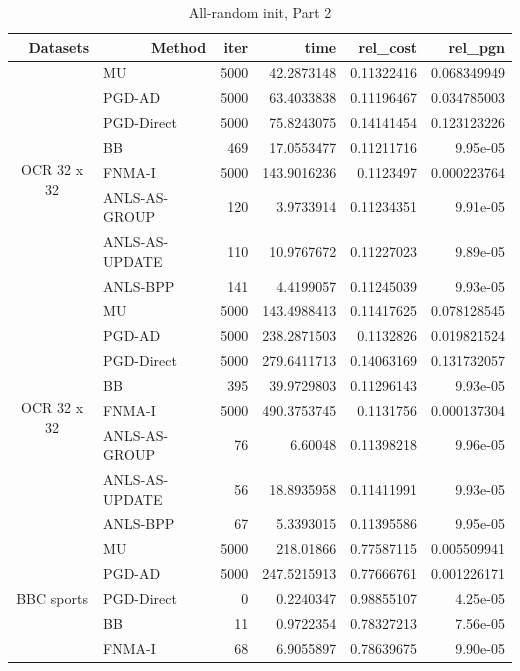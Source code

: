 \documentclass[conference,onecolumn,12pt]{IEEEtran}
\numberwithin{equation}{section}
\numberwithin{figure}{section}
\numberwithin{table}{section}
\theoremstyle{definition}
\begin{document}
\begin{table}[htbp]
	\centering
	\caption{All-random init, Part 2}
	  \begin{tabular}{clrrrr}
		\toprule
	  \multicolumn{1}{r}{Datasets} & \multicolumn{1}{r}{Method} & iter  & time  & rel\_cost & rel\_pgn \\ \midrule
	  \multirow{8}[0]{*}{OCR 32 x 32} & MU    & 5000  & 42.2873148 & 0.11322416 & 0.068349949 \\
			& PGD-AD & 5000  & 63.4033838 & 0.11196467 & 0.034785003 \\
			& PGD-Direct & 5000  & 75.8243075 & 0.14141454 & 0.123123226 \\
			& BB    & 469   & 17.0553477 & 0.11211716 & 9.95e-05 \\
			& FNMA-I & 5000  & 143.9016236 & 0.1123497 & 0.000223764 \\
			& ANLS-AS-GROUP & 120   & 3.9733914 & 0.11234351 & 9.91e-05 \\
			& ANLS-AS-UPDATE & 110   & 10.9767672 & 0.11227023 & 9.89e-05 \\
			& ANLS-BPP & 141   & 4.4199057 & 0.11245039 & 9.93e-05 \\ \midrule
	  \multirow{8}[0]{*}{OCR 32 x 32} & MU    & 5000  & 143.4988413 & 0.11417625 & 0.078128545 \\
			& PGD-AD & 5000  & 238.2871503 & 0.1132826 & 0.019821524 \\
			& PGD-Direct & 5000  & 279.6411713 & 0.14063169 & 0.131732057 \\
			& BB    & 395   & 39.9729803 & 0.11296143 & 9.93e-05 \\
			& FNMA-I & 5000  & 490.3753745 & 0.1131756 & 0.000137304 \\
			& ANLS-AS-GROUP & 76    & 6.60048 & 0.11398218 & 9.96e-05 \\
			& ANLS-AS-UPDATE & 56    & 18.8935958 & 0.11411991 & 9.93e-05 \\
			& ANLS-BPP & 67    & 5.3393015 & 0.11395586 & 9.95e-05 \\ \midrule
	  \multirow{8}[0]{*}{BBC sports} & MU    & 5000  & 218.01866 & 0.77587115 & 0.005509941 \\
			& PGD-AD & 5000  & 247.5215913 & 0.77666761 & 0.001226171 \\
			& PGD-Direct & 0     & 0.2240347 & 0.98855107 & 4.25e-05 \\
			& BB    & 11    & 0.9722354 & 0.78327213 & 7.56e-05 \\
			& FNMA-I & 68    & 6.9055897 & 0.78639675 & 9.90e-05 \\

\end{tabular}
\end{table}
\end{document}
